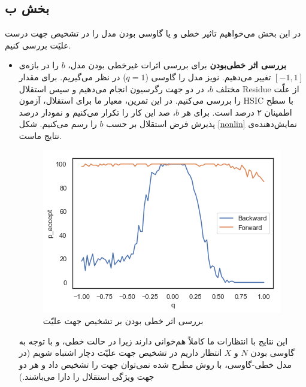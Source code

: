 \documentclass{article}
\begin{document}
\newpage
\subsection{بخش ب}
در این بخش می‌خواهیم تاثیر خطی و یا گاوسی بودن مدل را در تشخیص جهت درست علیَت  بررسی کنیم. 

\begin{itemize}
\item \textbf{بررسی اثر خطی‌بودن} 
برای بررسی اثرات غیرخطی بودن مدل، $b$ را در بازه‌ی $[-1, 1]$ تغییر می‌دهیم.  نویز مدل را گاوسی
($q=1$)
در نظر می‌گیریم.  برای مقدار مختلف $b$، در دو جهت رگرسیون انجام می‌دهیم و سپس استقلال Residue از علّت را بررسی می‌کنیم. در این تمرین، معیار ما برای استقلال، آزمون HSIC با سطح اطمینان ۲ درصد است.
برای هر $b$، صد این کار را تکرار می‌کنیم و نمودار درصد پذیرش فرض استقلال بر حسب $b$ را رسم می‌کنیم.
شکل
\eqref{nonlin}
نمایش‌دهنده‌ی نتایج ماست.
\begin{figure}[h!]
	\includegraphics[scale=0.45]{nonlin.png}
	\caption{بررسی اثر خطی بودن بر تشخیص جهت علیّت}
	\label{nonlin}
\end{figure}


این نتایج با انتظارات ما کاملاً هم‌خوانی دارند زیرا در حالت خطی، و با توجه به گاوسی بودن $N$ و $X$ انتظار داریم در تشخیص جهت علیّت دچار اشتباه شویم (در مدل خطی-گاوسی، با روش مطرح شده نمی‌توان جهت را تشخیص داد و هر دو جهت ویژگی استقلال را دارا می‌باشند.)


\end{itemize}
\end{document}
